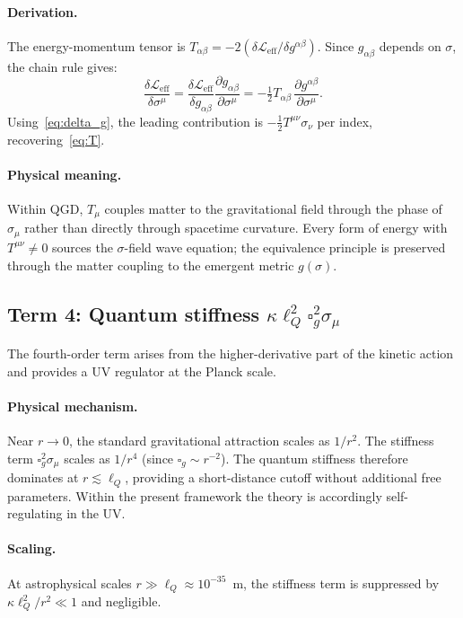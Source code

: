 \documentclass[11pt,a4paper]{article}
\theoremstyle{plain}
\theoremstyle{definition}
\theoremstyle{remark}
\newcommand{\lQ}{\ell_Q}
\newcommand{\boxg}{\square_g}
\newcommand{\half}{\tfrac{1}{2}}
\begin{document}
\paragraph{Derivation.}
The energy-momentum tensor is $T_{\alpha\beta} = -2(\delta\mathcal{L}_{\mathrm{eff}}/\delta g^{\alpha\beta})$.
Since $g_{\alpha\beta}$ depends on $\sigma$, the chain rule gives:
\[
  \frac{\delta\mathcal{L}_{\mathrm{eff}}}{\delta\sigma^\mu}
  = \frac{\delta\mathcal{L}_{\mathrm{eff}}}{\delta g_{\alpha\beta}}
    \frac{\partial g_{\alpha\beta}}{\partial\sigma^\mu}
  = -\half T_{\alpha\beta}\,\frac{\partial g^{\alpha\beta}}{\partial\sigma^\mu}.
\]
Using~\eqref{eq:delta_g}, the leading contribution is $-\half T^{\mu\nu}\sigma_\nu$ per
index, recovering~\eqref{eq:T}.

\paragraph{Physical meaning.}
Within QGD, $T_\mu$ couples matter to the gravitational field through the phase of $\sigma_\mu$ rather than directly through spacetime curvature.  Every form of energy with $T^{\mu\nu} \ne 0$ sources the $\sigma$-field wave equation; the equivalence principle is preserved through the matter coupling to the emergent metric $g(\sigma)$.

\subsection{Term 4: Quantum stiffness $\kappa\lQ^2\boxg^2\sigma_\mu$}
\label{sec:stiffness}

The fourth-order term arises from the higher-derivative part of the kinetic action and provides a UV regulator at the Planck scale.

\paragraph{Physical mechanism.}
Near $r \to 0$, the standard gravitational attraction scales as $1/r^2$.  The stiffness
term $\boxg^2\sigma_\mu$ scales as $1/r^4$ (since $\boxg \sim r^{-2}$).
The quantum stiffness therefore dominates at $r \lesssim \lQ$,
providing a short-distance cutoff without additional free parameters.  Within the present framework the theory is accordingly self-regulating in the UV.

\paragraph{Scaling.}
At astrophysical scales $r \gg \lQ \approx 10^{-35}$~m, the stiffness term is
suppressed by $\kappa\lQ^2/r^2 \ll 1$ and negligible.
\end{document}
